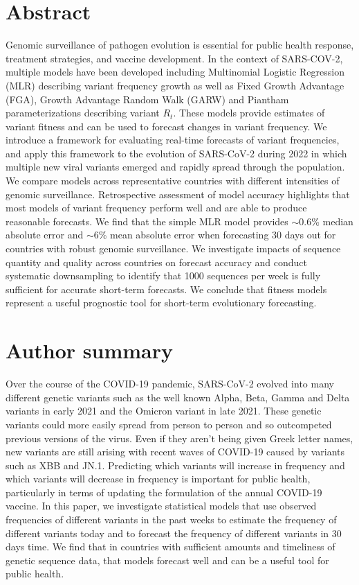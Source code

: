 \documentclass[10pt,letterpaper]{article}
\begin{document}
\section*{Abstract}
Genomic surveillance of pathogen evolution is essential for public health response, treatment strategies, and vaccine development.
In the context of SARS-COV-2, multiple models have been developed including Multinomial Logistic Regression (MLR) describing variant frequency growth as well as Fixed Growth Advantage (FGA), Growth Advantage Random Walk (GARW) and Piantham parameterizations describing variant $R_t$.
These models provide estimates of variant fitness and can be used to forecast changes in variant frequency.
We introduce a framework for evaluating real-time forecasts of variant frequencies, and apply this framework to the evolution of SARS-CoV-2 during 2022 in which multiple new viral variants emerged and rapidly spread through the population.
We compare models across representative countries with different intensities of genomic surveillance.
Retrospective assessment of model accuracy highlights that most models of variant frequency perform well and are able to produce reasonable forecasts.
We find that the simple MLR model provides $\sim$0.6\% median absolute error and $\sim$6\% mean absolute error when forecasting 30 days out for countries with robust genomic surveillance.
We investigate impacts of sequence quantity and quality across countries on forecast accuracy and conduct systematic downsampling to identify that 1000 sequences per week is fully sufficient for accurate short-term forecasts.
We conclude that fitness models represent a useful prognostic tool for short-term evolutionary forecasting.

\section*{Author summary}

Over the course of the COVID-19 pandemic, SARS-CoV-2 evolved into many different genetic variants such as the well known Alpha, Beta, Gamma and Delta variants in early 2021 and the Omicron variant in late 2021.
These genetic variants could more easily spread from person to person and so outcompeted previous versions of the virus. Even if they aren’t being given Greek letter names, new variants are still arising with recent waves of COVID-19 caused by variants such as XBB and JN.1.
Predicting which variants will increase in frequency and which variants will decrease in frequency is important for public health, particularly in terms of updating the formulation of the annual COVID-19 vaccine.
In this paper, we investigate statistical models that use observed frequencies of different variants in the past weeks to estimate the frequency of different variants today and to forecast the frequency of different variants in 30 days time.
We find that in countries with sufficient amounts and timeliness of genetic sequence data, that models forecast well and can be a useful tool for public health.
\end{document}
